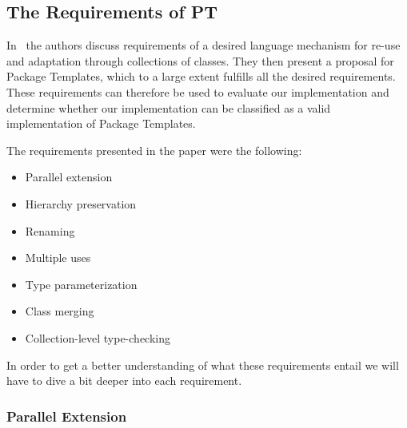 \subsection{The Requirements of PT}\label{subsec:the-requirements-of-pt}

In~\cite{jot} the authors discuss requirements of a desired language mechanism for re-use and adaptation through collections of classes.
They then present a proposal for Package Templates, which to a large extent fulfills all the desired requirements.
These requirements can therefore be used to evaluate our implementation and determine whether our implementation can be classified as a valid implementation of Package Templates.

The requirements presented in the paper were the following:

\begin{multicols}{2}
    \begin{itemize}
        \item Parallel extension
        \item Hierarchy preservation
        \item Renaming
        \item Multiple uses
        \item Type parameterization
        \item Class merging
        \item Collection-level type-checking
    \end{itemize}
\end{multicols}

In order to get a better understanding of what these requirements entail we will have to dive a bit deeper into each requirement.

\subsubsection{Parallel Extension}\label{subsubsec:parallel-extension}
%

